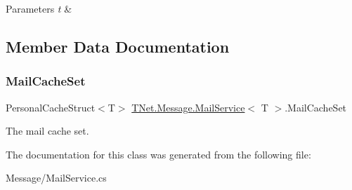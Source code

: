 \begin{DoxyParams}{Parameters}
{\em t} & \\
\hline
\end{DoxyParams}


\subsection{Member Data Documentation}
\mbox{\label{class_t_net_1_1_message_1_1_mail_service_a04a917f7ef30a7d77ff1172fad8d82ed}} 
\subsubsection{\texorpdfstring{Mail\+Cache\+Set}{MailCacheSet}}
{\footnotesize\ttfamily Personal\+Cache\+Struct$<$T$>$ \mbox{\hyperlink{class_t_net_1_1_message_1_1_mail_service}{T\+Net.\+Message.\+Mail\+Service}}$<$ T $>$.Mail\+Cache\+Set\hspace{0.3cm}{\ttfamily [protected]}}



The mail cache set. 



The documentation for this class was generated from the following file\+:\begin{DoxyCompactItemize}
\item 
Message/Mail\+Service.\+cs\end{DoxyCompactItemize}
